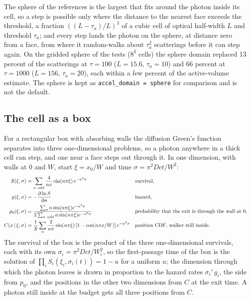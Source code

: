 \documentclass[11pt]{article}
\newcommand{\key}[1]{\texttt{#1}}
\begin{document}
The sphere of the references is the largest that fits around the photon inside its
cell, so a step is possible only where the distance to the nearest face exceeds the
threshold, a fraction $((L-\tau_a)/L)^3$ of a cubic cell of optical half-width $L$ and
threshold $\tau_a$; and every step lands the photon on the sphere, at distance zero from
a face, from where it random-walks about $\tau_a^2$ scatterings before it can step again.
On the gridded sphere of the tests ($8^3$ cells) the sphere domain replaced 13 percent of
the scatterings at $\tau=100$ ($L=15.6$, $\tau_a=10$) and 66 percent at $\tau=1000$
($L=156$, $\tau_a=20$), each within a few percent of the active-volume estimate.  The
sphere is kept as \key{accel\_domain = sphere} for comparison and is not the default.

\subsection{The cell as a box}

For a rectangular box with absorbing walls the diffusion Green's function separates into
three one-dimensional problems, so a photon anywhere in a thick cell can step, and one
near a face steps out through it.  In one dimension, with walls at $0$ and $W$, start
$\xi=x_0/W$ and time $\sigma=\pi^2Dct/W^2$:
\begin{align}
  S(\xi,\sigma)&=\sum_{n\ \rm odd}\frac{4}{n\pi}\sin(n\pi\xi)\,e^{-n^2\sigma}
  &&\text{survival},\\
  g(\xi,\sigma)&=-\frac{\partial\ln S}{\partial\sigma}
  &&\text{hazard},\\
  p_0(\xi,\sigma)&=\frac{\sum_n n\sin(n\pi\xi)e^{-n^2\sigma}}
                       {2\sum_{n\ \rm odd}n\sin(n\pi\xi)e^{-n^2\sigma}}
  &&\text{probability that the exit is through the wall at 0},\\
  C(x\,|\,\xi,\sigma)&=\frac1S\sum_n\frac{2}{n\pi}\sin(n\pi\xi)\,[1-\cos(n\pi x/W)]\,e^{-n^2\sigma}
  &&\text{position CDF, walker still inside}.
\end{align}
The survival of the box is the product of the three one-dimensional survivals, each with
its own $\sigma_i=\pi^2Dct/W_i^2$, so the first-passage time of the box is the solution
of $\prod_iS_i(\xi_i,\sigma_i(t))=1-u$ for a uniform $u$; the dimension through which the
photon leaves is drawn in proportion to the hazard rates $\sigma_i'\,g_i$, the side from
$p_0$, and the positions in the other two dimensions from $C$ at the exit time.  A photon
still inside at the budget gets all three positions from $C$.
\end{document}

